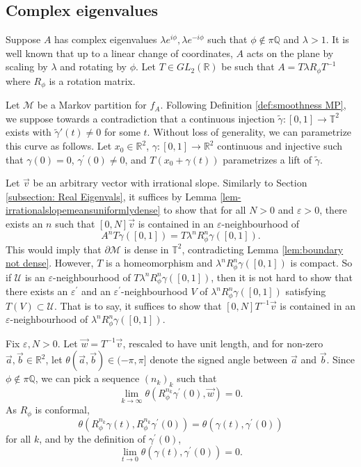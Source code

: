 \documentclass{article}
\def\Q{\mathbb{Q}}
\def\R{\mathbb{R}}
\def\T{\mathbb{T}}
\def\M{\mathcal{M}}
\begin{document}
\subsection{Complex eigenvalues}

Suppose $A$ has complex eigenvalues $\lambda e^{i\phi},\lambda e^{-i\phi}$ such that $\phi\notin \pi\Q$ and $\lambda > 1$. It is well known that up to a linear change of coordinates, $A$ acts on the plane by scaling by $\lambda$ and rotating by $\phi$. Let $T \in GL_2(\R)$ be such that $A = T\lambda R_{\phi} T^{-1}$ where $R_\phi$ is a rotation matrix.

Let $\M$ be a Markov partition for $f_A$. Following Definition \ref{def:smoothness MP}, we suppose towards a contradiction that a continuous injection $\tilde\gamma:[0,1]\to \T^2$ exists with $\tilde\gamma'(t)\neq 0$ for some $t$. Without loss of generality, we can parametrize this curve as follows. Let $x_0 \in \R^2$, $\gamma:[0,1] \to \R^2$ continuous and injective such that $\gamma(0) = 0$, $\gamma^\prime(0) \neq 0$, and $T(x_0 + \gamma(t))$ parametrizes a lift of $\tilde\gamma$.

Let $\vec{v}$ be an arbitrary vector with irrational slope. Similarly to Section \ref{subsection: Real Eigenvals}, it suffices by Lemma \ref{lem-irrationalslopemeansuniformlydense} to show that for all $N> 0$ and $\varepsilon > 0$, there exists an $n$ such that $[0,N] \vec v$ is contained in an $\varepsilon$-neighbourhood of
$$
    A^n T\gamma([0,1]) = T \lambda^n R^n_\phi\gamma([0,1]).
$$
This would imply that $\partial\M$ is dense in $\T^2$, contradicting Lemma \ref{lem:boundary not dense}. However, $T$ is a homeomorphism and $\lambda^n R^n_\phi\gamma([0,1])$ is compact. So if $\mathcal{U}$ is an $\varepsilon$-neighbourhood of $T\lambda^n R^n_\phi\gamma([0,1])$, then it is not hard to show that there exists an $\varepsilon^\prime$ and an $\varepsilon^\prime$-neighbourhood $V$ of $\lambda^n R^n_\phi\gamma([0,1])$ satisfying $T(V) \subset \mathcal{U}$. That is to say, it suffices to show that $[0,N] T^{-1} \vec v$ is contained in an $\varepsilon$-neighbourhood of $\lambda^n R^n_\phi\gamma([0,1])$.

Fix $\varepsilon, N > 0$. Let $\vec w = T^{-1} \vec v$, rescaled to have unit length, and for non-zero $\vec a, \vec b \in \R^2$, let $\theta(\vec a, \vec b) \in (-\pi,\pi]$ denote the signed angle between $\vec a$ and $\vec b$. Since $\phi \notin \pi\Q$, we can pick a sequence $(n_k)_k$ such that $$ \lim_{k\to\infty}\theta( R^{n_k}_\phi\gamma^\prime(0), \vec w) = 0.$$ As $R_\phi$ is conformal, $$\theta(R_\phi^{n_k} \gamma(t), R_\phi^{n_k} \gamma^\prime(0)) = \theta(\gamma(t), \gamma^\prime(0))$$ for all $k$, and by the definition of $\gamma^\prime(0)$, $$ \lim_{t\to 0}\theta(\gamma(t), \gamma^\prime(0)) = 0.$$ 
\end{document}

